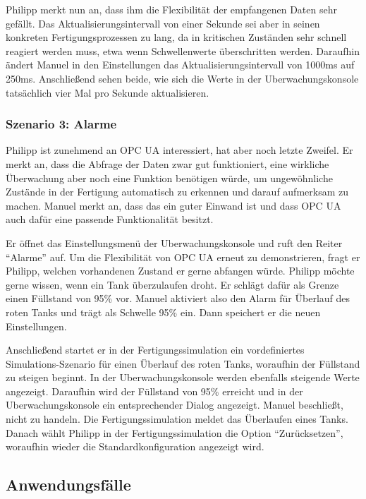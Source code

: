 \documentclass[parskip=full]{scrartcl}
\begin{document}
Philipp merkt nun an, dass ihm die Flexibilität der empfangenen Daten sehr gefällt. Das Aktualisierungsintervall von
einer Sekunde sei aber in seinen konkreten Fertigungsprozessen zu lang, da in kritischen Zuständen sehr schnell
reagiert werden muss, etwa wenn Schwellenwerte überschritten werden. Daraufhin ändert Manuel in den
Einstellungen das Aktualisierungsintervall von 1000ms auf 250ms. Anschließend sehen beide, wie sich die Werte in der
\gls{Uberwachungskonsole} tatsächlich vier Mal pro Sekunde aktualisieren.

\subsubsection{Szenario 3: Alarme}
Philipp ist zunehmend an \gls{OPC UA} interessiert, hat aber noch letzte Zweifel. Er merkt an, dass die Abfrage der Daten
zwar gut funktioniert, eine wirkliche \"Uberwachung aber noch eine Funktion ben\"otigen w\"urde,
um ungew\"ohnliche Zust\"ande in der Fertigung automatisch zu erkennen und darauf aufmerksam zu machen.
Manuel merkt an, dass das ein guter Einwand ist und dass \gls{OPC UA} auch daf\"ur eine passende Funktionalit\"at besitzt.

Er \"offnet das Einstellungsmen\"u der \gls{Uberwachungskonsole} und ruft den Reiter "`Alarme"' auf. Um die Flexibilit\"at
von \gls{OPC UA} erneut zu demonstrieren, fragt er Philipp, welchen vorhandenen Zustand er gerne abfangen w\"urde. Philipp möchte gerne
wissen, wenn ein Tank \"uberzulaufen droht. Er schl\"agt daf\"ur als Grenze einen F\"ullstand von 95\% vor.
Manuel aktiviert also den Alarm für Überlauf des roten Tanks und trägt als Schwelle 95\% ein.
Dann speichert er die neuen Einstellungen.

Anschlie{\ss}end startet er in der \gls{Fertigungssimulation} ein vordefiniertes \gls{Simulations-Szenario} für einen Überlauf
des roten Tanks, woraufhin der F\"ullstand zu steigen beginnt. In der \gls{Uberwachungskonsole} werden ebenfalls steigende Werte angezeigt.
Daraufhin wird der F\"ullstand von 95\% erreicht und in der \gls{Uberwachungskonsole} ein entsprechender Dialog angezeigt. Manuel
beschlie{\ss}t, nicht zu handeln. Die \gls{Fertigungssimulation} meldet das Überlaufen eines Tanks.
Danach w\"ahlt Philipp in der \gls{Fertigungssimulation} die Option "`Zur\"ucksetzen"',
woraufhin wieder die Standardkonfiguration angezeigt wird.

\subsection{Anwendungsfälle}
\end{document}
